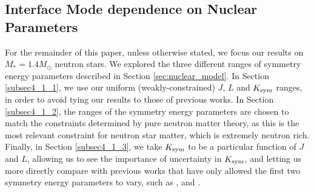 \documentclass[fleqn,usenatbib]{mnras}
\begin{document}














\subsection{Interface Mode dependence on Nuclear Parameters}
\label{sec:EoS_sets}
\hspace{\parindent}For the remainder of this paper, unless otherwise stated, we focus our results on $M_*=1.4M_{\odot}$ neutron stars. We explored the three different ranges of symmetry energy parameters described in Section \ref{sec:nuclear_model}. In Section \ref{subsec4_1_1}, we use our uniform (weakly-constrained) $J$, $L$ and $K_{\rm sym}$ ranges, in order to avoid tying our results to those of previous works. In Section \ref{subsec4_1_2}, the ranges of the symmetry energy parameters are chosen to match the constraints determined by pure neutron matter theory, as this is the most relevant constraint for neutron star matter, which is extremely neutron rich. Finally, in Section \ref{subsec4_1_3}, we take $K_{\rm sym}$ to be a particular function of $J$ and $L$, allowing us to see the importance of uncertainty in $K_{\rm sym}$, and letting us more directly compare with previous works that have only allowed the first two symmetry energy parameters to vary, such as \citet{chen2010density}, \citet{steiner2012connecting} and \citet{tsang2009constraints}.
\end{document}
